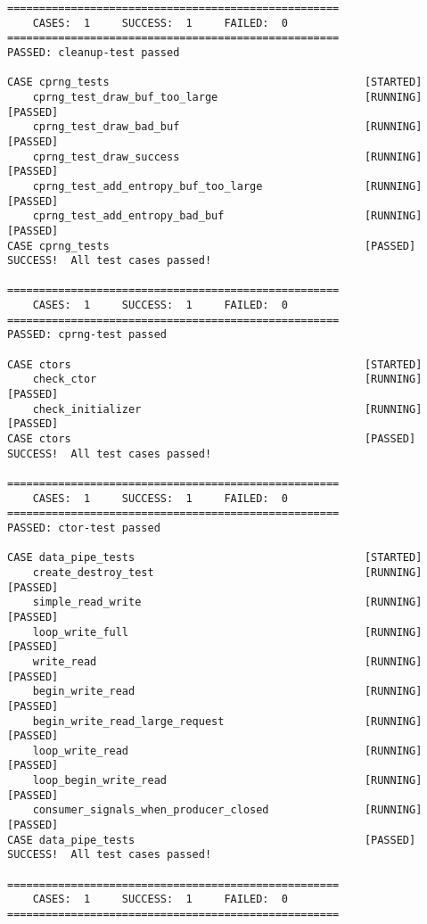 \documentclass[14pt,a4paper]{article}
\begin{document}
\begin{lstlisting}
====================================================
    CASES:  1     SUCCESS:  1     FAILED:  0   
====================================================
PASSED: cleanup-test passed

CASE cprng_tests                                        [STARTED] 
    cprng_test_draw_buf_too_large                       [RUNNING] [PASSED] 
    cprng_test_draw_bad_buf                             [RUNNING] [PASSED] 
    cprng_test_draw_success                             [RUNNING] [PASSED] 
    cprng_test_add_entropy_buf_too_large                [RUNNING] [PASSED] 
    cprng_test_add_entropy_bad_buf                      [RUNNING] [PASSED] 
CASE cprng_tests                                        [PASSED]
SUCCESS!  All test cases passed!

====================================================
    CASES:  1     SUCCESS:  1     FAILED:  0   
====================================================
PASSED: cprng-test passed

CASE ctors                                              [STARTED] 
    check_ctor                                          [RUNNING] [PASSED] 
    check_initializer                                   [RUNNING] [PASSED] 
CASE ctors                                              [PASSED]
SUCCESS!  All test cases passed!

====================================================
    CASES:  1     SUCCESS:  1     FAILED:  0   
====================================================
PASSED: ctor-test passed

CASE data_pipe_tests                                    [STARTED] 
    create_destroy_test                                 [RUNNING] [PASSED] 
    simple_read_write                                   [RUNNING] [PASSED] 
    loop_write_full                                     [RUNNING] [PASSED] 
    write_read                                          [RUNNING] [PASSED] 
    begin_write_read                                    [RUNNING] [PASSED] 
    begin_write_read_large_request                      [RUNNING] [PASSED] 
    loop_write_read                                     [RUNNING] [PASSED] 
    loop_begin_write_read                               [RUNNING] [PASSED] 
    consumer_signals_when_producer_closed               [RUNNING] [PASSED] 
CASE data_pipe_tests                                    [PASSED]
SUCCESS!  All test cases passed!

====================================================
    CASES:  1     SUCCESS:  1     FAILED:  0   
====================================================
\end{lstlisting}
\end{document}
